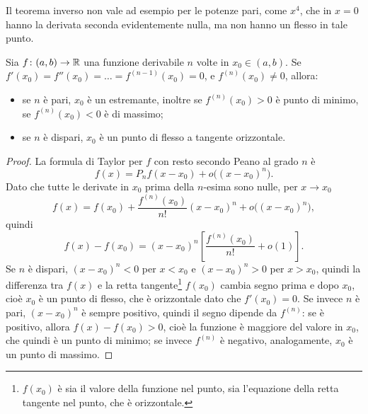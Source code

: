Il teorema inverso non vale ad esempio per le potenze pari, come $x^4$, che in $x=0$ hanno la derivata seconda evidentemente nulla, ma non hanno un flesso in tale punto.
\begin{teorema}
Sia $f\colon(a,b)\to\mathbb{R}$ una funzione derivabile $n$ volte in $x_0\in(a,b)$. Se $f'(x_0)=f''(x_0)=\dots=f^{(n-1)}(x_0)=0$, e $f^{(n)}(x_0)\neq0$, allora:
\begin{itemize}
\item se $n$ è pari, $x_0$ è un estremante, inoltre se $f^{(n)}(x_0)>0$ è punto di minimo, se $f^{(n)}(x_0)<0$ è di massimo;
\item se $n$ è dispari, $x_0$ è un punto di flesso a tangente orizzontale.
\end{itemize}
\end{teorema}
\begin{proof}
La formula di Taylor per $f$ con resto secondo Peano al grado $n$ è
\[
f(x)=P_nf(x-x_0)+o\big((x-x_0)^n\big).
\]
Dato che tutte le derivate in $x_0$ prima della $n$-esima sono nulle, per $x\to x_0$
\[
f(x)=f(x_0)+\frac{f^{(n)}(x_0)}{n!}(x-x_0)^n+o\big((x-x_0)^n\big),
\]
quindi
\[
f(x)-f(x_0)=(x-x_0)^n\left[\frac{f^{(n)}(x_0)}{n!}+o(1)\right].
\]
Se $n$ è dispari, $(x-x_0)^n<0$ per $x<x_0$ e $(x-x_0)^n>0$ per $x>x_0$, quindi la differenza tra $f(x)$ e la retta tangente\footnote{$f(x_0)$ è sia il valore della funzione nel punto, sia l'equazione della retta tangente nel punto, che è orizzontale.} $f(x_0)$ cambia segno prima e dopo $x_0$, cioè $x_0$ è un punto di flesso, che è orizzontale dato che $f'(x_0)=0$.
Se invece $n$ è pari, $(x-x_0)^n$ è sempre positivo, quindi il segno dipende da $f^{(n)}$: se è positivo, allora $f(x)-f(x_0)>0$, cioè la funzione è maggiore del valore in $x_0$, che quindi è un punto di minimo; se invece $f^{(n)}$ è negativo, analogamente, $x_0$ è un punto di massimo.
\end{proof}
